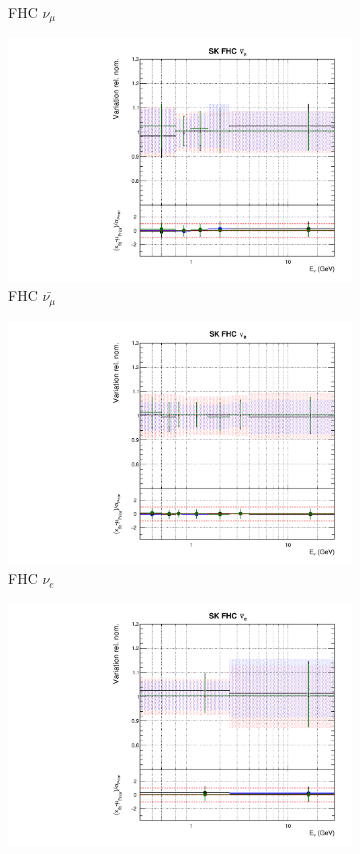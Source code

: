 \begin{figure}
\begin{subfigure}{0.45\textwidth}
  \caption{\SK FHC $\nu_{\mu}$}
\end{subfigure}
\begin{subfigure}{0.45\textwidth}
  \centering
  \includegraphics[width=0.75\linewidth]{figs/hptpcfitsflux_9}
  \caption{\SK FHC $\bar{\nu_{\mu}}$}
\end{subfigure}
\begin{subfigure}{0.45\textwidth}
  \centering
  \includegraphics[width=0.75\linewidth]{figs/hptpcfitsflux_10}
  \caption{\SK FHC $\nu_e$}
\end{subfigure}
\begin{subfigure}{0.45\textwidth}
  \centering
  \includegraphics[width=0.75\linewidth]{figs/hptpcfitsflux_11}

\end{subfigure}
\end{figure}
